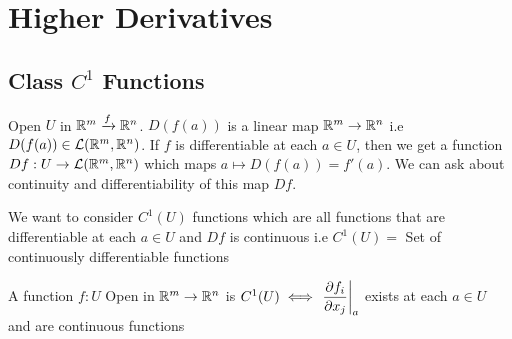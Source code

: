 \chapter{Higher Derivatives}
\section{Class \texorpdfstring{$C^1$}{C1} Functions}
Open $U$ in $\mathbb{R}^m\xrightarrow{f}\mathbb{R}^n$. $D(f(a))$ is a linear map $\mathbb{R}^m\to \mathbb{R}^n$ i.e $D(f(a))\in \mathcal{L}(\mathbb{R}^m,\mathbb{R}^n)$. If $f$ is differentiable at each $a\in U$, then we get a function $Df:{U\to\mathcal{L}(\mathbb{R}^m,\mathbb{R}^n)}$  which maps $a\longmapsto D(f(a))=f'(a)$. We can ask about continuity and differentiability of this map $Df$.

We want to consider $C^1(U)$ functions which are all functions that are differentiable at each $a\in U$ and $Df$ is continuous i.e $C^1(U)=$ Set of continuously differentiable functions
\begin{Theorem}{}{}
	A function $f:U$ Open in $\mathbb{R}^m\to \mathbb{R}^n$ is $C^1(U)\iff \left.\dfrac{\partial f_i}{\partial x_j}\right|_a$ exists at each $a\in U$ and are continuous functions
\end{Theorem}
